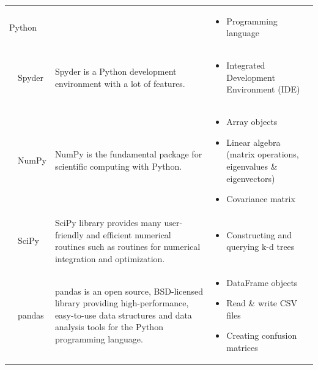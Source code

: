 \begin{longtable}{ p{} p{} p{} }
	\addlinespace	
	Python & & 
	\begin{minipage}[t]{0.3\textwidth}
		\begin{itemize}[leftmargin=*,noitemsep]
			\item Programming language
		\end{itemize}
	\end{minipage}\\

	\addlinespace
	\ \ Spyder & Spyder is a Python development environment with a lot of features. &
	\begin{minipage}[t]{0.3\textwidth}
		\begin{itemize}[leftmargin=*,noitemsep]
			\item Integrated Development Environment (IDE)
		\end{itemize}
	\end{minipage}\\

	\addlinespace
	\ \ NumPy & NumPy is the fundamental package for scientific computing with Python. &
	\begin{minipage}[t]{0.3\textwidth}
		\begin{itemize}[leftmargin=*,noitemsep]
			\item Array objects
			\item Linear algebra (matrix operations, eigenvalues \& eigenvectors)
			\item Covariance matrix
		\end{itemize}
	\end{minipage}\\

	\addlinespace
	\ \ SciPy & SciPy library provides many user-friendly and efficient numerical routines such as routines for numerical integration and optimization. &
	\begin{minipage}[t]{0.3\textwidth}
		\begin{itemize}[leftmargin=*,noitemsep]
			\item Constructing and querying k-d trees
		\end{itemize}
	\end{minipage}\\

	\addlinespace
	\ \ pandas & pandas is an open source, BSD-licensed library providing high-performance, easy-to-use data structures and data analysis tools for the Python programming language. &
	\begin{minipage}[t]{0.3\textwidth}
		\begin{itemize}[leftmargin=*,noitemsep]
			\item DataFrame objects
			\item Read \& write CSV files
			\item Creating confusion matrices
		\end{itemize}
	\end{minipage}\\


\end{longtable}
